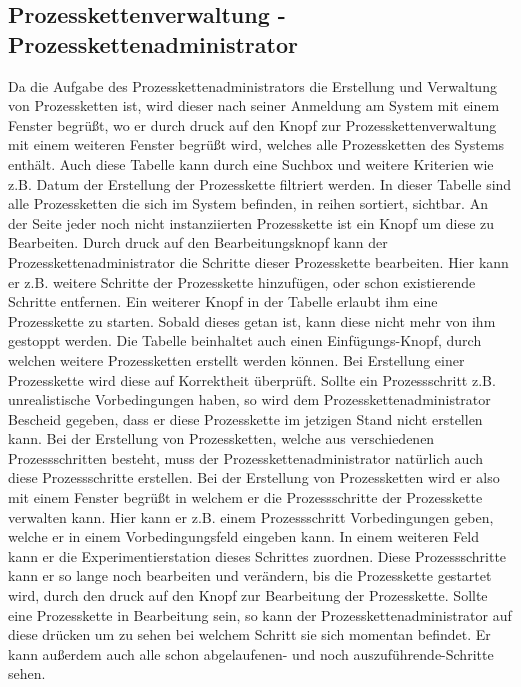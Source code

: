 \documentclass[enabledeprecatedfontcommands,fontsize=12pt,paper=a4,twoside]{scrartcl}
\begin{document}
\subsection{Prozesskettenverwaltung - Prozesskettenadministrator}

Da die Aufgabe des Prozesskettenadministrators die Erstellung und Verwaltung von Prozessketten ist, wird dieser nach seiner Anmeldung am System mit einem Fenster begrüßt, wo er durch druck auf den Knopf zur Prozesskettenverwaltung mit einem weiteren Fenster begrüßt wird, welches alle Prozessketten des Systems enthält.
Auch diese Tabelle kann durch eine Suchbox und weitere Kriterien wie z.B. Datum der Erstellung der Prozesskette filtriert werden.
In dieser Tabelle sind alle Prozessketten die sich im System befinden, in reihen sortiert, sichtbar. An der Seite jeder noch nicht instanziierten Prozesskette ist ein Knopf um diese zu Bearbeiten. Durch druck auf den Bearbeitungsknopf kann der Prozesskettenadministrator die Schritte dieser Prozesskette bearbeiten. Hier kann er z.B. weitere Schritte der Prozesskette hinzufügen, oder schon existierende Schritte entfernen.
Ein weiterer Knopf in der Tabelle erlaubt ihm eine Prozesskette zu starten. Sobald dieses getan ist, kann diese nicht mehr von ihm gestoppt werden.
Die Tabelle beinhaltet auch einen Einfügungs-Knopf, durch welchen weitere Prozessketten erstellt werden können.
Bei Erstellung einer Prozesskette wird diese auf Korrektheit überprüft. Sollte ein Prozessschritt z.B. unrealistische Vorbedingungen haben, so wird dem Prozesskettenadministrator Bescheid gegeben, dass er diese Prozesskette im jetzigen Stand nicht erstellen kann.
Bei der Erstellung von Prozessketten, welche aus verschiedenen Prozessschritten besteht, muss der Prozesskettenadministrator natürlich auch diese Prozessschritte erstellen. Bei der Erstellung von Prozessketten wird er also mit einem Fenster begrüßt in welchem er die Prozessschritte der Prozesskette verwalten kann.
Hier kann er z.B. einem Prozessschritt Vorbedingungen geben, welche er in einem Vorbedingungsfeld eingeben kann. In einem weiteren Feld kann er die Experimentierstation dieses Schrittes zuordnen. Diese Prozessschritte kann er so lange noch bearbeiten und verändern, bis die Prozesskette gestartet wird, durch den druck auf den Knopf zur Bearbeitung der Prozesskette. 
Sollte eine Prozesskette in Bearbeitung sein, so kann der Prozesskettenadministrator auf diese drücken um zu sehen bei welchem Schritt sie sich momentan befindet. Er kann außerdem auch alle schon abgelaufenen- und noch auszuführende-Schritte sehen.
 
\end{document}
